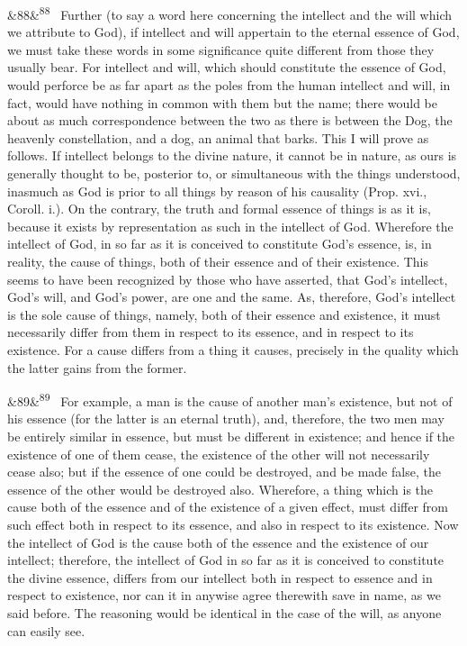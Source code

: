 \documentclass[12pt]{article}
\newcommand{\para}[1][]{\par\noindent\ifx&#1&\else\textsuperscript{\footnotesize #1}~\fi}
\begin{document}
\para[88] Further (to say a word here concerning the intellect and the will which we attribute to God), if intellect and will appertain to the eternal essence of God, we must take these words in some significance quite different from those they usually bear. For intellect and will, which should constitute the essence of God, would perforce be as far apart as the poles from the human intellect and will, in fact, would have nothing in common with them but the name; there would be about as much correspondence between the two as there is between the Dog, the heavenly constellation, and a dog, an animal that barks. This I will prove as follows. If intellect belongs to the divine nature, it cannot be in nature, as ours is generally thought to be, posterior to, or simultaneous with the things understood, inasmuch as God is prior to all things by reason of his causality (Prop. xvi., Coroll. i.). On the contrary, the truth and formal essence of things is as it is, because it exists by representation as such in the intellect of God. Wherefore the intellect of God, in so far as it is conceived to constitute God's essence, is, in reality, the cause of things, both of their essence and of their existence. This seems to have been recognized by those who have asserted, that God's intellect, God's will, and God's power, are one and the same. As, therefore, God's intellect is the sole cause of things, namely, both of their essence and existence, it must necessarily differ from them in respect to its essence, and in respect to its existence. For a cause differs from a thing it causes, precisely in the quality which the latter gains from the former.

\para[89] For example, a man is the cause of another man's existence, but not of his essence (for the latter is an eternal truth), and, therefore, the two men may be entirely similar in essence, but must be different in existence; and hence if the existence of one of them cease, the existence of the other will not necessarily cease also; but if the essence of one could be destroyed, and be made false, the essence of the other would be destroyed also. Wherefore, a thing which is the cause both of the essence and of the existence of a given effect, must differ from such effect both in respect to its essence, and also in respect to its existence. Now the intellect of God is the cause both of the essence and the existence of our intellect; therefore, the intellect of God in so far as it is conceived to constitute the divine essence, differs from our intellect both in respect to essence and in respect to existence, nor can it in anywise agree therewith save in name, as we said before. The reasoning would be identical in the case of the will, as anyone can easily see.
\end{document}
